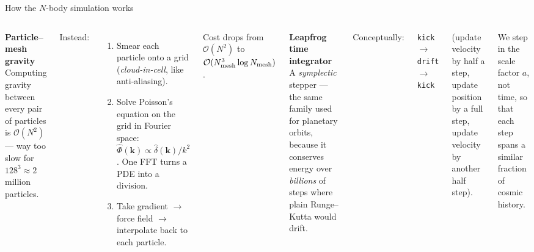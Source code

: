 \documentclass[aspectratio=169,11pt]{beamer}
\begin{document}
\begin{frame}{How the $N$-body simulation works}
  \begin{columns}[T]
    \textbf{Particle--mesh gravity} \\
    Computing gravity between every pair of particles is
    $\mathcal O(N^2)$ --- way too slow for $128^3 \approx 2$ million
    particles.

    \smallskip
    Instead:
    \begin{enumerate}\itemsep0.15em
      \item Smear each particle onto a grid
            (\emph{cloud-in-cell}, like anti-aliasing).
      \item Solve Poisson's equation on the grid in Fourier space:
            $\hat\Phi(\mathbf k) \propto \hat\delta(\mathbf k)/k^2$.
            One FFT turns a PDE into a division.
      \item Take gradient $\to$ force field $\to$ interpolate
            back to each particle.
    \end{enumerate}

    \smallskip
    \small Cost drops from $\mathcal O(N^2)$ to
    $\mathcal O(N_{\rm mesh}^3 \log N_{\rm mesh})$.

    \textbf{Leapfrog time integrator} \\
    A \emph{symplectic} stepper --- the same family used for planetary
    orbits, because it conserves energy over \emph{billions} of steps
    where plain Runge--Kutta would drift.

    \smallskip
    Conceptually:
    \begin{center}
      \small
      \texttt{kick} $\to$ \texttt{drift} $\to$ \texttt{kick}
    \end{center}
    (update velocity by half a step, update position by a full step,
    update velocity by another half step).

    \smallskip
    We step in the scale factor $a$, not time, so that each step
    spans a similar fraction of cosmic history.
  \end{columns}
\end{frame}
\end{document}

